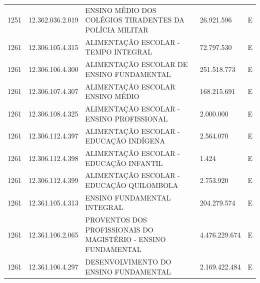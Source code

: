 \documentclass{article}
\begin{document}
\begin{longtable}[c]{m{1cm}|m{2cm}|m{10cm}|m{2cm}|m{1cm}}
\multicolumn{1}{C{1cm}|}{1251} & \multicolumn{1}{C{2cm}|}{12.362.036.2.019} & \multicolumn{1}{L{10cm}|}{ENSINO MÉDIO DOS COLÉGIOS TIRADENTES DA POLÍCIA MILITAR} & \multicolumn{1}{R{2cm}|}{26.921.596} & \multicolumn{1}{C{1cm}}{E} \\
\multicolumn{1}{C{1cm}|}{1261} & \multicolumn{1}{C{2cm}|}{12.306.105.4.315} & \multicolumn{1}{L{10cm}|}{ALIMENTAÇÃO ESCOLAR - TEMPO INTEGRAL} & \multicolumn{1}{R{2cm}|}{72.797.530} & \multicolumn{1}{C{1cm}}{E} \\
\multicolumn{1}{C{1cm}|}{1261} & \multicolumn{1}{C{2cm}|}{12.306.106.4.300} & \multicolumn{1}{L{10cm}|}{ALIMENTAÇÃO ESCOLAR DE ENSINO FUNDAMENTAL} & \multicolumn{1}{R{2cm}|}{251.518.773} & \multicolumn{1}{C{1cm}}{E} \\
\multicolumn{1}{C{1cm}|}{1261} & \multicolumn{1}{C{2cm}|}{12.306.107.4.307} & \multicolumn{1}{L{10cm}|}{ALIMENTAÇÃO ESCOLAR ENSINO MÉDIO} & \multicolumn{1}{R{2cm}|}{168.215.691} & \multicolumn{1}{C{1cm}}{E} \\
\multicolumn{1}{C{1cm}|}{1261} & \multicolumn{1}{C{2cm}|}{12.306.108.4.325} & \multicolumn{1}{L{10cm}|}{ALIMENTAÇÃO ESCOLAR - ENSINO PROFISSIONAL} & \multicolumn{1}{R{2cm}|}{2.000.000} & \multicolumn{1}{C{1cm}}{E} \\
\multicolumn{1}{C{1cm}|}{1261} & \multicolumn{1}{C{2cm}|}{12.306.112.4.397} & \multicolumn{1}{L{10cm}|}{ALIMENTAÇÃO ESCOLAR - EDUCAÇÃO INDÍGENA} & \multicolumn{1}{R{2cm}|}{2.564.070} & \multicolumn{1}{C{1cm}}{E} \\
\multicolumn{1}{C{1cm}|}{1261} & \multicolumn{1}{C{2cm}|}{12.306.112.4.398} & \multicolumn{1}{L{10cm}|}{ALIMENTAÇÃO ESCOLAR - EDUCAÇÃO INFANTIL} & \multicolumn{1}{R{2cm}|}{1.424} & \multicolumn{1}{C{1cm}}{E} \\
\multicolumn{1}{C{1cm}|}{1261} & \multicolumn{1}{C{2cm}|}{12.306.112.4.399} & \multicolumn{1}{L{10cm}|}{ALIMENTAÇÃO ESCOLAR - EDUCAÇÃO QUILOMBOLA} & \multicolumn{1}{R{2cm}|}{2.753.920} & \multicolumn{1}{C{1cm}}{E} \\
\multicolumn{1}{C{1cm}|}{1261} & \multicolumn{1}{C{2cm}|}{12.361.105.4.313} & \multicolumn{1}{L{10cm}|}{ENSINO FUNDAMENTAL INTEGRAL} & \multicolumn{1}{R{2cm}|}{204.279.574} & \multicolumn{1}{C{1cm}}{E} \\
\multicolumn{1}{C{1cm}|}{1261} & \multicolumn{1}{C{2cm}|}{12.361.106.2.065} & \multicolumn{1}{L{10cm}|}{PROVENTOS DOS PROFISSIONAIS DO MAGISTÉRIO - ENSINO FUNDAMENTAL} & \multicolumn{1}{R{2cm}|}{4.476.229.674} & \multicolumn{1}{C{1cm}}{E} \\
\multicolumn{1}{C{1cm}|}{1261} & \multicolumn{1}{C{2cm}|}{12.361.106.4.297} & \multicolumn{1}{L{10cm}|}{DESENVOLVIMENTO DO ENSINO FUNDAMENTAL} & \multicolumn{1}{R{2cm}|}{2.169.422.484} & \multicolumn{1}{C{1cm}}{E} \\

\end{longtable}
\end{document}
